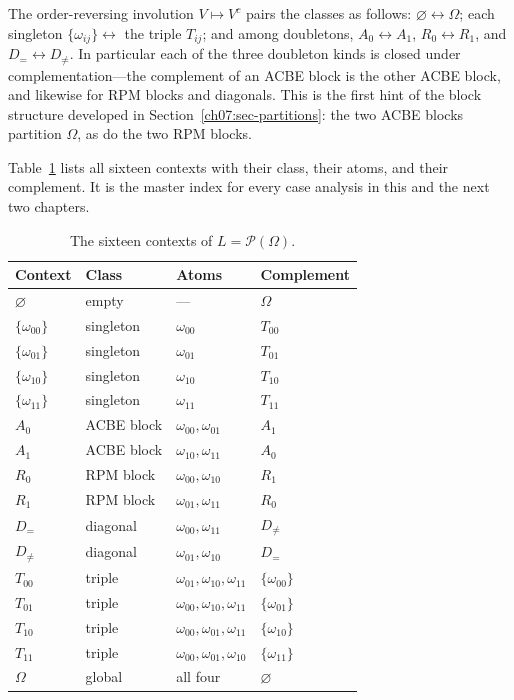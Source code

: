 \begin{remark}\label{ch07:rem-complement}
The order-reversing involution $V\mapsto V^{c}$ pairs the classes as follows: $\varnothing\leftrightarrow\Omega$; each singleton $\{\omega_{ij}\}\leftrightarrow$ the triple $T_{ij}$; and among doubletons, $A_{0}\leftrightarrow A_{1}$, $R_{0}\leftrightarrow R_{1}$, and $D_{=}\leftrightarrow D_{\neq}$. In particular each of the three doubleton kinds is closed under complementation---the complement of an ACBE block is the other ACBE block, and likewise for RPM blocks and diagonals. This is the first hint of the block structure developed in Section~\ref{ch07:sec-partitions}: the two ACBE blocks partition $\Omega$, as do the two RPM blocks.
\end{remark}

Table~\ref{ch07:tab-contexts} lists all sixteen contexts with their class, their atoms, and their complement. It is the master index for every case analysis in this and the next two chapters.

\begin{table}[htbp]
\centering
\caption{The sixteen contexts of $L=\mathcal{P}(\Omega)$.}
\label{ch07:tab-contexts}
\begin{tabular}{@{}llll@{}}
\toprule
Context & Class & Atoms & Complement \\
\midrule
$\varnothing$ & empty & --- & $\Omega$ \\
$\{\omega_{00}\}$ & singleton & $\omega_{00}$ & $T_{00}$ \\
$\{\omega_{01}\}$ & singleton & $\omega_{01}$ & $T_{01}$ \\
$\{\omega_{10}\}$ & singleton & $\omega_{10}$ & $T_{10}$ \\
$\{\omega_{11}\}$ & singleton & $\omega_{11}$ & $T_{11}$ \\
$A_{0}$ & ACBE block & $\omega_{00},\omega_{01}$ & $A_{1}$ \\
$A_{1}$ & ACBE block & $\omega_{10},\omega_{11}$ & $A_{0}$ \\
$R_{0}$ & RPM block & $\omega_{00},\omega_{10}$ & $R_{1}$ \\
$R_{1}$ & RPM block & $\omega_{01},\omega_{11}$ & $R_{0}$ \\
$D_{=}$ & diagonal & $\omega_{00},\omega_{11}$ & $D_{\neq}$ \\
$D_{\neq}$ & diagonal & $\omega_{01},\omega_{10}$ & $D_{=}$ \\
$T_{00}$ & triple & $\omega_{01},\omega_{10},\omega_{11}$ & $\{\omega_{00}\}$ \\
$T_{01}$ & triple & $\omega_{00},\omega_{10},\omega_{11}$ & $\{\omega_{01}\}$ \\
$T_{10}$ & triple & $\omega_{00},\omega_{01},\omega_{11}$ & $\{\omega_{10}\}$ \\
$T_{11}$ & triple & $\omega_{00},\omega_{01},\omega_{10}$ & $\{\omega_{11}\}$ \\
$\Omega$ & global & all four & $\varnothing$ \\
\bottomrule
\end{tabular}
\end{table}

